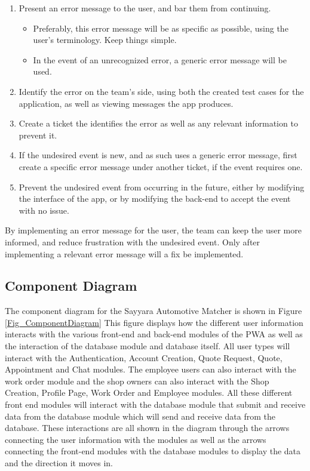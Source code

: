 \documentclass[12pt, titlepage]{article}
\begin{document}
\begin{enumerate}
    \item Present an error message to the user, and bar them from continuing.
    \begin{itemize}
        \item Preferably, this error message will be as specific as possible, using the user's terminology. Keep things simple.
        \item In the event of an unrecognized error, a generic error message will be used.
    \end{itemize}
    \item Identify the error on the team's side, using both the created test cases for the application, as well as viewing messages the app produces.
    \item Create a ticket the identifies the error as well as any relevant information to prevent it.
    \item If the undesired event is new, and as such uses a generic error message, first create a specific error message under another ticket, if the event requires one.
    \item Prevent the undesired event from occurring in the future, either by modifying the interface of the app, or by modifying the back-end to accept the event with no issue.
\end{enumerate}

By implementing an error message for the user, the team can keep the user more informed, and reduce frustration with the undesired event. Only after implementing a relevant error message will a fix be implemented.

\subsection{Component Diagram}

\noindent
The component diagram for the Sayyara Automotive Matcher is shown in Figure \ref{Fig_ComponentDiagram} This figure displays how the different user information interacts with the various front-end and back-end modules of the PWA as well as the interaction of the database module and database itself. All user types will interact with the Authentication, Account Creation, Quote Request, Quote, Appointment and Chat modules. The employee users can also interact with the work order module and the shop owners can also interact with the Shop Creation, Profile Page, Work Order and Employee modules. All these different front end modules will interact with the database module that submit and receive data from the database module which will send and receive data from the database. These interactions are all shown in the diagram through the arrows connecting the user information with the modules as well as the arrows connecting the front-end modules with the database modules to display the data and the direction it moves in.
\end{document}
